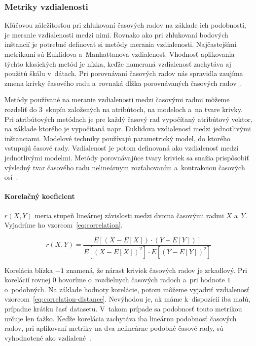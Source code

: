 \documentclass[a4paper,twoside,slovak,12pt,appendix]{article}
\begin{document}
\subsubsection{Metriky vzdialenosti}
\label{c:distance-metrics}
Kľúčovou záležitosťou pri zhlukovaní časových radov na základe ich podobnosti,
je meranie vzdialenosti medzi nimi. Rovnako ako pri zhlukovaní bodových
inštancií je potrebné definovať si metódy merania vzdialenosti. Najčastejšími
metrikami sú Euklidova a~Manhattanova vzdialenosť. Vhodnosť aplikovania
týchto klasických metód je nízka, keďže nameraná vzdialenosť zachytáva aj
použitú škálu v~dátach. Pri porovnávaní časových radov nás spravidla zaujíma
zmena krivky časového radu a~rovnaká dĺžka porovnávaných časových
radov~\cite{Dzeroski2007,WarrenLiao2005}.

Metódy používané na meranie vzdialenosti medzi časovými radmi môžeme rozdeliť do
3~skupín založených na atribútoch, na modeloch a~na tvare krivky. Pri
atribútových metódach je pre každý časový rad vypočítaný atribútový vektor, na
základe ktorého je vypočítaná napr. Euklidova vzdialenosť medzi jednotlivými
inštanciami. Modelové techniky používajú parametrický model, do ktorého vstupujú
časové rady. Vzdialenosť je potom definovaná ako vzdialenosť medzi jednotlivými
modelmi. Metódy porovnávajúce tvary kriviek sa snažia prispôsobiť výsledný tvar
časového radu nelineárnym rozťahovaním a~kontrakciou časových
osí~\cite{Hautamaki2008}.


\paragraph{Korelačný koeficient} $r(X, Y)$ meria stupeň lineárnej závislosti
medzi dvoma časovými radmi $X$ a~$Y$. Vyjadríme ho vzorcom~\ref{eq:correlation}.

\begin{equation}
	\label{eq:correlation}
  r \left( X, Y \right) = \frac
  {E \left[ \left( X - E \left[ X \right] \right) \cdot \left( Y - E \left[ Y \right] \right) \right]}
  {E \left[ \left( X - E \left[ X \right] \right)^2 \right] \cdot E \left[ \left( Y - E \left[ Y \right] \right)^2 \right]}
\end{equation}

Korelácia blízka $-1$ znamená, že nárast kriviek časových radov je zrkadlový.
Pri korelácií rovnej $0$ hovoríme o~rozdielnych časových radoch a~pri hodnote
$1$ o~podobných. Na základe hodnoty korelácie, potom môžeme vyjadriť vzdialenosť
vzorcom~\ref{eq:correlation-distance}. Nevýhodou je, ak máme k~dispozícií iba
malú, prípadne krátku časť datasetu. V~takom prípade sa podobnosť touto metrikou
určuje len ťažko. Keďže korelácia zachytáva iba lineárnu podobnosť časových
radov, pri aplikovaní metriky na dva nelineárne podobné časové rady, sú
vyhodnotené ako vzdialené~\cite{Dzeroski2007}.
\end{document}
